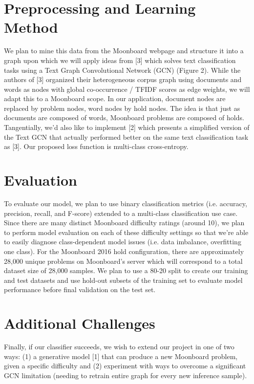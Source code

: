 \documentclass{article}
\begin{document}
\section{Preprocessing and Learning Method}
We plan to mine this data from the Moonboard webpage and structure it into a graph upon which we will apply ideas from [3] which solves text classification tasks using a Text Graph Convolutional Network (GCN) (Figure 2). While the authors of [3] organized their heterogeneous corpus graph using documents and words as nodes with global co-occurrence / TFIDF scores as edge weights, we will adapt this to a Moonboard scope. In our application, document nodes are replaced by problem nodes, word nodes by hold nodes. The idea is that just as documents are composed of words, Moonboard problems are composed of holds. Tangentially, we'd also like to implement  [2] which presents a simplified version of the Text GCN that actually performed better on the same text classification task as [3]. Our proposed loss function is multi-class cross-entropy.

\section{Evaluation}
To evaluate our model, we plan to use binary classification metrics (i.e. accuracy, precision, recall, and F-score) extended to a multi-class classification use case. Since there are many distinct Moonboard difficulty ratings (around 10), we plan to perform model evaluation on each of these difficulty settings so that we're able to easily diagnose class-dependent model issues (i.e. data imbalance, overfitting one class). For the Moonboard 2016 hold configuration, there are approximately 28,000 unique problems on Moonboard's server which will correspond to a total dataset size of 28,000 samples. We plan to use a 80-20 split to create our training and test datasets and use hold-out subsets of the training set to evaluate model performance before final validation on the test set. 

\section{Additional Challenges}
Finally, if our classifier succeeds, we wish to extend our project in one of two ways: (1) a generative model [1] that can produce a new Moonboard problem, given a specific difficulty and (2) experiment with ways to overcome a significant GCN limitation (needing to retrain entire graph for every new inference sample).
\end{document}
